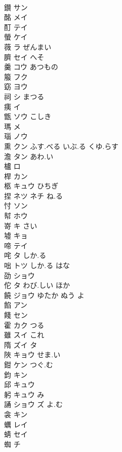 \documentclass[8pt]{extreport}
\begin{document}
\begin{CJK}{UTF8}{min}
\\	鑚	サン			
\\	酩	メイ			
\\	酊	テイ			
\\	螢	ケイ			
\\	薇	ラ ぜんまい			
\\	臍	セイ へそ			
\\	羹	コウ あつもの			
\\	箙	フク			
\\	窈	ヨウ			
\\	祠	シ まつる			
\\	痍	イ			
\\	甑	ソウ こしき			
\\	瑪	メ			
\\	瑙	ノウ			
\\	熏	クン ふす.べる いぶ.る くゆ.らす					
\\	澹	タン あわ.い			
\\	櫨	ロ			
\\	桿	カン			
\\	柩	キュウ ひちぎ			
\\	捏	ネツ ネチ ね.る			
\\	忖	ソン			
\\	幇	ホウ			
\\	嵜	キ さい			
\\	墟	キョ			
\\	啼	テイ			
\\	咤	タ しか.る			
\\	咄	トツ しか.る はな			
\\	劭	ショウ			
\\	佗	タ わび.しい ほか			
\\	饒	ジョウ ゆたか ぬう よ			
\\	餡	アン			
\\	餞	セン			
\\	霍	カク つる			
\\	雖	スイ これ			
\\	隋	ズイ タ			
\\	陜	キョウ せま.い			
\\	鉗	ケン つぐ.む			
\\	鈞	キン			
\\	邱	キュウ			
\\	躬	キュウ み			
\\	誦	ショウ ズ よ.む			
\\	衾	キン			
\\	蠣	レイ			
\\	蜻	セイ			
\\	蜘	チ			

\end{CJK}
\end{document}
